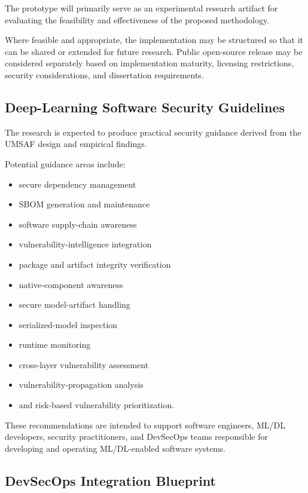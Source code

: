 \documentclass[
  12pt,
  letterpaper,
  oneside]{report}
\providecommand{\tightlist}{%
  \setlength{\itemsep}{0pt}\setlength{\parskip}{0pt}}
\begin{document}
The prototype will primarily serve as an experimental research artifact
for evaluating the feasibility and effectiveness of the proposed
methodology.

Where feasible and appropriate, the implementation may be structured so
that it can be shared or extended for future research. Public
open-source release may be considered separately based on implementation
maturity, licensing restrictions, security considerations, and
dissertation requirements.

\subsection{Deep-Learning Software Security Guidelines}\label{1242-deep-learning-software-security-guidelines}

The research is expected to produce practical security guidance derived
from the UMSAF design and empirical findings.

Potential guidance areas include:

\begin{itemize}
\tightlist
\item
  secure dependency management
\item
  SBOM generation and maintenance
\item
  software supply-chain awareness
\item
  vulnerability-intelligence integration
\item
  package and artifact integrity verification
\item
  native-component awareness
\item
  secure model-artifact handling
\item
  serialized-model inspection
\item
  runtime monitoring
\item
  cross-layer vulnerability assessment
\item
  vulnerability-propagation analysis
\item
  and risk-based vulnerability prioritization.
\end{itemize}

These recommendations are intended to support software engineers, ML/DL
developers, security practitioners, and DevSecOps teams responsible for
developing and operating ML/DL-enabled software systems.

\subsection{DevSecOps Integration Blueprint}\label{1243-devsecops-integration-blueprint}
\end{document}
